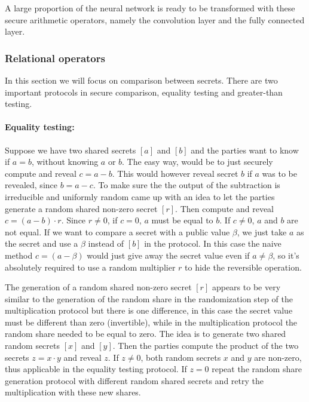 A large proportion of the neural network is ready to be transformed with these secure arithmetic operators, namely the convolution layer and the fully connected layer.

\subsubsection{Relational operators}
In this section we will focus on comparison between secrets. There are two important protocols in secure comparison, equality testing and greater-than testing.

\paragraph{Equality testing:}
Suppose we have two shared secrets $[a]$ and $[b]$ and the parties want to know if $a = b$, without knowing $a$ or $b$.
The easy way, would be to just securely compute and reveal $c = a - b$. This would however reveal secret $b$ if $a$ was to be revealed, since $b = a - c$. To make sure the the output of the subtraction is irreducible and uniformly random \cite{franklin1996joint} came up with an idea to let the parties generate a random shared non-zero secret $[r]$.
Then compute and reveal $c = (a - b) \cdot r$. Since $r \neq 0$, if $c = 0$, $a$ must be equal to $b$. If $c \neq 0$, $a$ and $b$ are not equal. If we want to compare a secret with a public value $\beta$, we just take $a$ as the secret and use a $\beta$ instead of $[b]$ in the protocol. In this case the naive method $c = (a - \beta)$ would just give away the secret value even if $a \neq \beta$, so it's absolutely required to use a random multiplier $r$ to hide the reversible operation.

The generation of a random shared non-zero secret $[r]$ appears to be very similar to the generation of the random share in the randomization step of the multiplication protocol but there is one difference, in this case the secret value must be different than zero (invertible), while in the multiplication protocol the random share needed to be equal to zero. The idea is to generate two shared random secrets $[x]$ and $[y]$. Then the parties compute the product of the two secrets $z = x \cdot y$ and reveal $z$. If $z \neq 0$, both random secrets $x$ and $y$ are non-zero, thus applicable in the equality testing protocol. If $z = 0$ repeat the random share generation protocol with different random shared secrets and retry the multiplication with these new shares.

